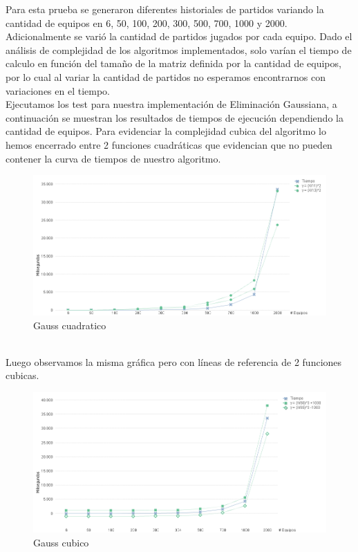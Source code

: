 Para esta prueba se generaron diferentes historiales de partidos variando la cantidad de equipos en 6, 50, 100, 200, 300, 500, 700, 1000 y 2000. \\

Adicionalmente se varió la cantidad de partidos jugados por cada equipo. Dado el análisis de complejidad de los algoritmos implementados, solo varían el tiempo de calculo en
función del tamaño de la matriz definida por la cantidad de equipos, por lo cual al variar la cantidad de partidos no esperamos encontrarnos con variaciones en el tiempo. \\

Ejecutamos los test para nuestra implementación de Eliminación Gaussiana, a continuación se muestran los resultados de tiempos de ejecución dependiendo la cantidad de equipos.
Para evidenciar la complejidad cubica del algoritmo lo hemos encerrado entre 2 funciones cuadráticas que evidencian que no pueden contener la curva de tiempos de nuestro algoritmo. \\

\begin{figure}[H]
    \centering
    \includegraphics[width=1\textwidth]{IMG/gauss cuadrativo.png}
    \caption{Gauss cuadratico}
    \label{fig:Gauss cuadratico}
\end{figure}

\\

Luego observamos la misma gráfica pero con líneas de referencia de 2 funciones cubicas. \\

\begin{figure}[H]
    \centering
    \includegraphics[width=1\textwidth]{IMG/gauss cubico.png}
    \caption{Gauss cubico}
    \label{fig:Gauss cubico}
\end{figure}


